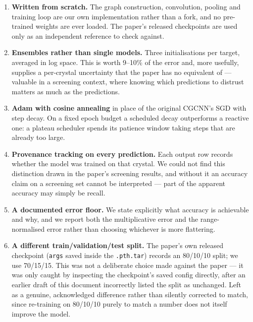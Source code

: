 \documentclass[11pt,a4paper]{article}
\begin{document}
\begin{enumerate}\setlength{\itemsep}{5pt}

\item \textbf{Written from scratch.} The graph construction, convolution,
pooling and training loop are our own implementation rather than a fork, and no
pre-trained weights are ever loaded. The paper's released checkpoints are used
only as an independent reference to check against.

\item \textbf{Ensembles rather than single models.} Three initialisations per
target, averaged in log space. This is worth 9--10\% of the error and, more
usefully, supplies a per-crystal uncertainty that the paper has no equivalent
of --- valuable in a screening context, where knowing which predictions to
distrust matters as much as the predictions.

\item \textbf{Adam with cosine annealing} in place of the original CGCNN's SGD
with step decay. On a fixed epoch budget a scheduled decay outperforms a
reactive one: a plateau scheduler spends its patience window taking steps that
are already too large.

\item \textbf{Provenance tracking on every prediction.} Each output row records
whether the model was trained on that crystal. We could not find this
distinction drawn in the paper's screening results, and without it an accuracy
claim on a screening set cannot be interpreted --- part of the apparent accuracy
may simply be recall.

\item \textbf{A documented error floor.} We state explicitly what accuracy is
achievable and why, and we report both the multiplicative error and the
range-normalised error rather than choosing whichever is more flattering.
\item \textbf{A different train/validation/test split.} The paper's own
released checkpoint (\texttt{args} saved inside the \texttt{.pth.tar}) records
an 80/10/10 split; we use 70/15/15. This was not a deliberate choice made
against the paper --- it was only caught by inspecting the checkpoint's saved
config directly, after an earlier draft of this document incorrectly listed
the split as unchanged. Left as a genuine, acknowledged difference rather than
silently corrected to match, since re-training on 80/10/10 purely to match a
number does not itself improve the model.
\end{enumerate}
\end{document}
